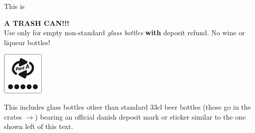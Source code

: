 \documentclass{article}
\begin{document}
\fontsize{40}{50}\selectfont

\parindent 0pt
\parskip 20pt

\maketitle
\null
\vspace{-1cm}

\begin{center}

  {\Huge This is}\\
  \vspace{1cm}

  {\fontsize{70}{80}\selectfont \bfseries{\color{red}{NOT}} A TRASH CAN!!!}\\

  \vspace{2cm}
  {\Huge Use only for empty non-standard \textit{glass bottles} \textbf{with} deposit
    refund. No wine or liqueur bottles!}

  \begin{minipage}{0.1\textwidth}
  \includegraphics[width=2cm]{billeder/refund-mark.png}
\end{minipage}
  \begin{minipage}{0.8\textwidth}
    {\Large This includes glass bottles other than standard 33cl beer
    bottles (those go in the crates $\rightarrow$) bearing an official danish deposit
    mark or sticker similar to the one shown left of this text.}
\end{minipage}

\end{center}

\underskriv
\end{document}
